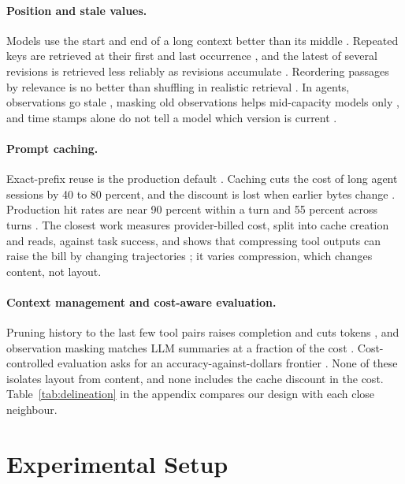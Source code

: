 \paragraph{Position and stale values.} Models use the start and end of a long context better than its middle \citep{a2307_03172,a2406_16008}. Repeated keys are retrieved at their first and last occurrence \citep{a2510_22752}, and the latest of several revisions is retrieved less reliably as revisions accumulate \citep{a2603_12271}. Reordering passages by relevance is no better than shuffling in realistic retrieval \citep{a2505_15561}. In agents, observations go stale \citep{a2610_05281}, masking old observations helps mid-capacity models only \citep{a2606_00408}, and time stamps alone do not tell a model which version is current \citep{a2602_01313}.

\paragraph{Prompt caching.} Exact-prefix reuse is the production default \citep{a2312_07104,a2311_04934}. Caching cuts the cost of long agent sessions by 40 to 80 percent, and the discount is lost when earlier bytes change \citep{a2601_06007,a2607_15516}. Production hit rates are near 90 percent within a turn and 55 percent across turns \citep{a2608_00101}. The closest work measures provider-billed cost, split into cache creation and reads, against task success, and shows that compressing tool outputs can raise the bill by changing trajectories \citep{a2607_12161}; it varies compression, which changes content, not layout.

\paragraph{Context management and cost-aware evaluation.} Pruning history to the last few tool pairs raises completion and cuts tokens \citep{a2606_10209}, and observation masking matches LLM summaries at a fraction of the cost \citep{a2508_21433,a2605_18854}. Cost-controlled evaluation asks for an accuracy-against-dollars frontier \citep{a2407_01502,a2504_13359,a2510_11977}. None of these isolates layout from content, and none includes the cache discount in the cost. Table~\ref{tab:delineation} in the appendix compares our design with each close neighbour.

\section{Experimental Setup}
\label{sec:setup}

